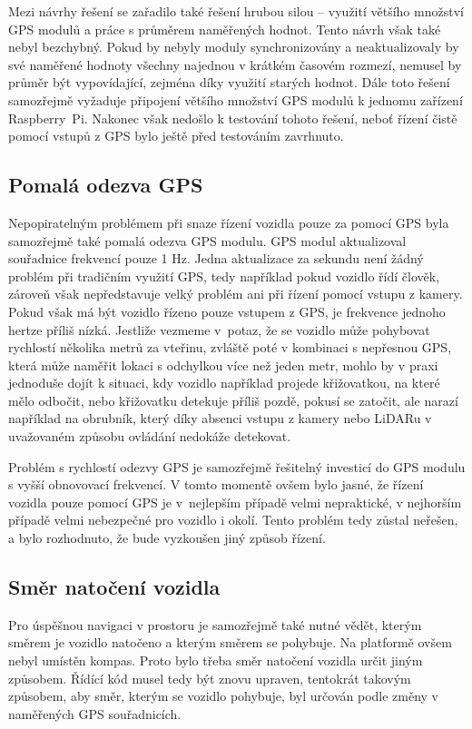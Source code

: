 \documentclass[czech, bachelor]{diploma}
\begin{document}
Mezi návrhy řešení se zařadilo také řešení hrubou silou -- využití většího množství GPS modulů a práce s průměrem naměřených
hodnot. Tento návrh však také nebyl bezchybný. Pokud by nebyly moduly synchronizovány a neaktualizovaly by své naměřené hodnoty
všechny najednou v krátkém časovém rozmezí, nemusel by průměr být vypovídající, zejména díky využití starých hodnot. Dále toto
řešení samozřejmě vyžaduje připojení většího množství GPS modulů k jednomu zařízení Raspberry~Pi. Nakonec však nedošlo k testování
tohoto řešení, neboť řízení čistě pomocí vstupů z GPS bylo ještě před testováním zavrhnuto.

\subsection{Pomalá odezva GPS} \label{gps-low-polling-rate}

Nepopiratelným problémem při snaze řízení vozidla pouze za pomocí GPS byla samozřejmě také pomalá odezva GPS modulu. GPS modul
aktualizoval souřadnice frekvencí pouze 1 Hz. Jedna aktualizace za sekundu není žádný problém při tradičním využití GPS, tedy
například pokud vozidlo řídí člověk, zároveň však nepředstavuje velký problém ani při řízení pomocí vstupu z kamery. Pokud však
má být vozidlo řízeno pouze vstupem z GPS, je frekvence jednoho hertze příliš nízká. Jestliže vezmeme v~potaz, že se vozidlo může
pohybovat rychlostí několika metrů za vteřinu, zvláště poté v kombinaci s nepřesnou GPS, která může naměřit lokaci s odchylkou
více než jeden metr, mohlo by v praxi jednoduše dojít k situaci, kdy vozidlo například projede křižovatkou, na které mělo odbočit,
nebo křižovatku detekuje příliš pozdě, pokusí se zatočit, ale narazí například na obrubník, který díky absenci vstupu z kamery
nebo LiDARu v uvažovaném způsobu ovládání nedokáže detekovat.

Problém s rychlostí odezvy GPS je samozřejmě řešitelný investicí do GPS modulu s vyšší obnovovací frekvencí. V tomto momentě ovšem
bylo jasné, že řízení vozidla pouze pomocí GPS je v~nejlepším případě velmi nepraktické, v nejhorším případě velmi nebezpečné
pro vozidlo i okolí. Tento problém tedy zůstal neřešen, a bylo rozhodnuto, že bude vyzkoušen jiný způsob řízení.

\subsection{Směr natočení vozidla} \label{directions-and-angles}

Pro úspěšnou navigaci v prostoru je samozřejmě také nutné vědět, kterým směrem je vozidlo natočeno a kterým směrem se pohybuje.
Na platformě ovšem nebyl umístěn kompas. Proto bylo třeba směr natočení vozidla určit jiným způsobem. Řídící kód musel tedy být
znovu upraven, tentokrát takovým způsobem, aby směr, kterým se vozidlo pohybuje, byl určován podle změny v naměřených GPS
souřadnicích.
\end{document}
